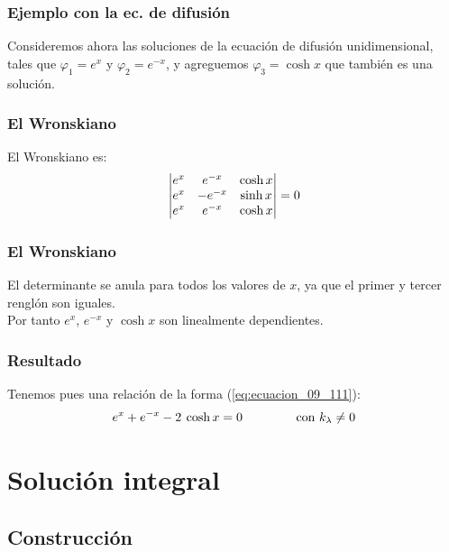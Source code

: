 \documentclass[12pt]{beamer}
\begin{document}
\begin{frame}
\frametitle{Ejemplo con la ec. de difusión}
Consideremos ahora las soluciones de la ecuación de difusión unidimensional, tales que $\varphi_{1} = e^{x}$ y $\varphi_{2} = e^{-x}$, y agreguemos $\varphi_{3} = \cosh x$ que también es una solución. 
\end{frame}
\begin{frame}
\frametitle{El Wronskiano}
El Wronskiano es:
\pause
\begin{align*}
\mdet{
e^{x}  & e^{-x} & \cosh x \\
e^{x}  & -e^{-x} & \sinh x \\
e^{x}  & e^{-x} & \cosh x
} = 0
\end{align*}
\end{frame}
\begin{frame}
\frametitle{El Wronskiano}
El determinante se anula para todos los valores de $x$, ya que el primer y tercer renglón son iguales.
\\
\bigskip
\pause
Por tanto $e^{x}$, $e^{-x}$ y $\cosh x$ son linealmente dependientes.
\end{frame}
\begin{frame}
\frametitle{Resultado}
Tenemos pues una relación de la forma (\ref{eq:ecuacion_09_111}):
\pause
\begin{align*}
e^{x} + e^{-x} - 2 \: \cosh x = 0 \hspace{1.5cm} \text{con } k_{\lambda} \neq 0
\end{align*}
\end{frame}

\section{Solución integral}
\subsection{Construcción}
\end{document}
